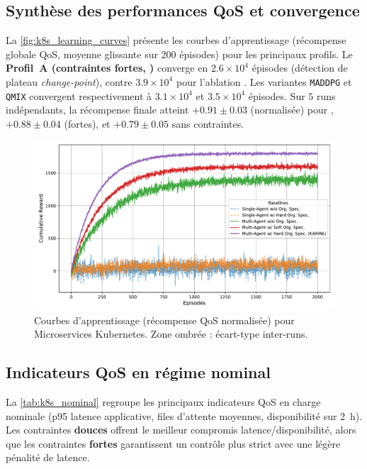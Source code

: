 \subsection*{Synthèse des performances QoS et convergence}

La \autoref{fig:k8s_learning_curves} présente les courbes d'apprentissage (récompense globale QoS, moyenne glissante sur $200$ épisodes) pour les principaux profils.
Le \textbf{Profil~A (contraintes fortes, )} converge en $2.6\times 10^4$ épisodes (détection de plateau \emph{change-point}), contre $3.9\times 10^4$ pour l'ablation \texttt{}.
Les variantes \texttt{MADDPG} et \texttt{QMIX} convergent respectivement à $3.1\times 10^4$ et $3.5\times 10^4$ épisodes.
Sur $5$ runs indépendants, la récompense finale atteint $+0.91 \pm 0.03$ (normalisée) pour , $+0.88 \pm 0.04$ (fortes), et $+0.79 \pm 0.05$ sans contraintes.

\begin{figure}[h!]
  \centering
  \includegraphics[width=0.75\linewidth]{figures/results_k8s_learning.pdf}
  \caption[Courbes d'apprentissage (récompense QoS normalisée) pourMicroservices Kubernetes]{Courbes d'apprentissage (récompense QoS normalisée) pour Microservices Kubernetes. Zone ombrée : écart-type inter-runs.}
  \label{fig:k8s_learning_curves}
\end{figure}

\subsection*{Indicateurs QoS en régime nominal}

La \autoref{tab:k8s_nominal} regroupe les principaux indicateurs QoS en charge nominale (p95 latence applicative, files d'attente moyennes, disponibilité sur 2~h).
Les contraintes \textbf{douces} offrent le meilleur compromis latence/disponibilité, alors que les contraintes \textbf{fortes} garantissent un contrôle plus strict avec une légère pénalité de latence.

